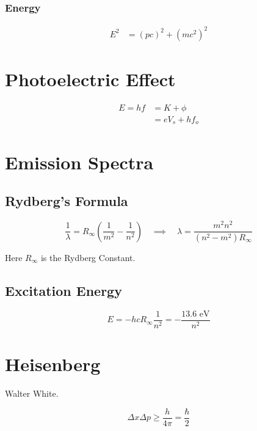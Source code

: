 \documentclass[11pt]{article}
\begin{document}
\subsubsection{Energy}
\begin{align*}
E^2 &= (pc)^2 + (mc^2)^2
\end{align*}


\section{Photoelectric Effect}

\begin{align*}
    E = hf &= K + \phi \\
    &= eV_s + hf_o
\end{align*}

\section{Emission Spectra}
\subsection{Rydberg's Formula}

$$\frac{1}\lambda = R_\infty\left(\frac{1}{m^2} - \frac{1}{n^2} \right) \quad \implies \quad \lambda = \frac{m^2n^2}{(n^2-m^2)R_\infty}$$

Here $R_\infty$ is the Rydberg Constant.

\subsection{Excitation Energy}

$$E = -hcR_\infty \frac{1}{n^2} = -\frac{\text{13.6 eV}}{n^2}$$

\section{Heisenberg}

Walter White.

$$\Delta x \Delta p \geq \frac{h}{4\pi} = \frac{\hbar}{2}$$
\end{document}
